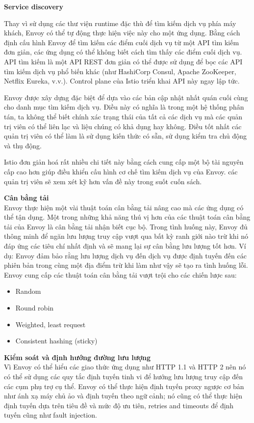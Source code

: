 \documentclass[14pt,a4paper]{book}
\begin{document}
		\textbf{Service discovery}
		
		Thay vì sử dụng các thư viện runtime đặc thù để tìm kiếm dịch vụ phía máy khách, Envoy có thể tự động thực hiện việc này cho một ứng dụng. Bằng cách định cấu hình Envoy để tìm kiếm các điểm cuối dịch vụ từ một API tìm kiếm đơn giản, các ứng dụng có thể không biết cách tìm thấy các điểm cuối dịch vụ. API tìm kiếm là một API REST đơn giản có thể được sử dụng để bọc các API tìm kiếm dịch vụ phổ biến khác (như HashiCorp Consul, Apache ZooKeeper, Netflix Eureka, v.v.). Control plane của Istio triển khai API này ngay lập tức.
		
		Envoy được xây dựng đặc biệt để dựa vào các bản cập nhật nhất quán cuối cùng cho danh mục tìm kiếm dịch vụ. Điều này có nghĩa là trong một hệ thống phân tán, ta không thể biết chính xác trạng thái của tất cả các dịch vụ mà các quản trị viên có thể liên lạc và liệu chúng có khả dụng hay không. Điều tốt nhất các quản trị viên có thể làm là sử dụng kiến thức có sẵn, sử dụng kiểm tra chủ động và thụ động.
		
		Istio đơn giản hoá rất nhiều chi tiết này bằng cách cung cấp một bộ tài nguyên cấp cao hơn giúp điều khiển cấu hình cơ chế tìm kiếm dịch vụ của Envoy. các quản trị viên sẽ xem xét kỹ hơn vấn đề này trong suốt cuốn sách.
		
		\textbf{Cân bằng tải}\\
		\hspace{0.6cm}Envoy thực hiện một vài thuật toán cân bằng tải nâng cao mà các ứng dụng có thể tận dụng. Một trong những khả năng thú vị hơn của các thuật toán cân bằng tải của Envoy là cân bằng tải nhận biết cục bộ. Trong tình huống này, Envoy đủ thông minh để ngăn lưu lượng truy cập vượt qua bất kỳ ranh giới nào trừ khi nó đáp ứng các tiêu chí nhất định và sẽ mang lại sự cân bằng lưu lượng tốt hơn. Ví dụ: Envoy đảm bảo rằng lưu lượng dịch vụ đến dịch vụ được định tuyến đến các phiên bản trong cùng một địa điểm trừ khi làm như vậy sẽ tạo ra tình huống lỗi. Envoy cung cấp các thuật toán cân bằng tải vượt trội cho các chiến lược sau:
		\begin{itemize}
			\item 		Random
			\item 		Round robin
			\item 		Weighted, least request
			\item 		Consistent hashing (sticky) 
		\end{itemize}		
		
		\textbf{Kiểm soát và định hướng đường lưu lượng}\\
		Vì Envoy có thể hiểu các giao thức ứng dụng như HTTP 1.1 và HTTP 2 nên nó có thể sử dụng các quy tắc định tuyến tinh vi để hướng lưu lượng truy cập đến các cụm phụ trợ cụ thể. Envoy có thể thực hiện định tuyến proxy ngược cơ bản như ánh xạ máy chủ ảo và định tuyến theo ngữ cảnh; nó cũng có thể thực hiện định tuyến dựa trên tiêu đề và mức độ ưu tiên, retries and timeouts để định tuyến cũng như fault injection.
		
\end{document}
